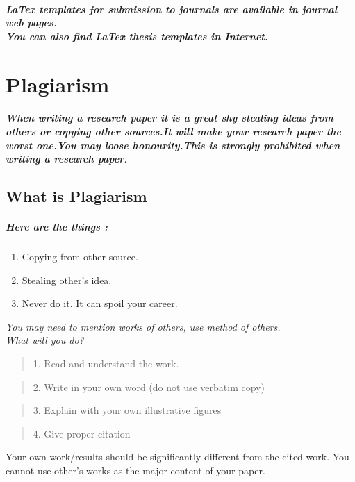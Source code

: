 \documentclass[20pt]{report}
\begin{document}
\paragraph{ LaTex templates for submission to journals are available in
journal web pages.\\
You can also find LaTex thesis templates in Internet.}

\chapter{Plagiarism}
\paragraph{When writing a research paper it is a great shy stealing ideas from others or copying other sources.It will make your research paper the worst one.You may loose honourity.This is strongly prohibited when writing a research paper.}
\section{What is Plagiarism}
\paragraph{Here are the things :}
\begin{enumerate}
\item Copying from other source.
\item Stealing other’s idea.
\item Never do it. It can spoil your career.
\end{enumerate}
\begin{center}
\emph{{\Large You may need to mention works of others, use method of
others.\\What will you do?}}

\end{center}
\begin{verse}
1. Read and understand the work.
\end{verse}
\begin{verse}
2. Write in your own word (do not use verbatim copy)
\end{verse}
\begin{verse}
3. Explain with your own illustrative figures
\end{verse}
\begin{verse}
4. Give proper citation
\end{verse}
Your own work/results should be significantly different from the
cited work. You cannot use other’s works as the major content
of your paper.
\end{document}
